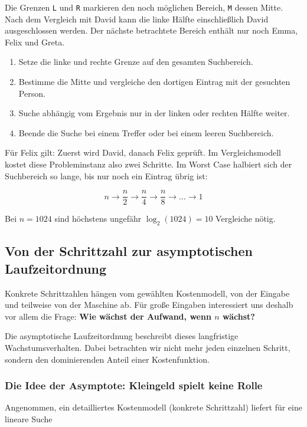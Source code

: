 \documentclass{article}
\begin{document}
Die Grenzen \texttt{L} und \texttt{R} markieren den noch möglichen Bereich, \texttt{M} dessen Mitte. Nach dem Vergleich mit David kann die linke Hälfte einschließlich David ausgeschlossen werden. Der nächste betrachtete Bereich enthält nur noch Emma, Felix und Greta.

\begin{enumerate}
  \item Setze die linke und rechte Grenze auf den gesamten Suchbereich.
  \item Bestimme die Mitte und vergleiche den dortigen Eintrag mit der gesuchten Person.
  \item Suche abhängig vom Ergebnis nur in der linken oder rechten Hälfte weiter.
  \item Beende die Suche bei einem Treffer oder bei einem leeren Suchbereich.
\end{enumerate}

Für Felix gilt: Zuerst wird David, danach Felix geprüft. Im Vergleichsmodell kostet diese Probleminstanz also zwei Schritte. Im Worst Case halbiert sich der Suchbereich so lange, bis nur noch ein Eintrag übrig ist:

\[
n \rightarrow \frac{n}{2} \rightarrow \frac{n}{4} \rightarrow \frac{n}{8} \rightarrow \dots \rightarrow 1
\]

Bei \(n=1024\) sind höchstens ungefähr \(\log_2(1024)=10\) Vergleiche nötig.

\subsection{Von der Schrittzahl zur asymptotischen Laufzeitordnung}

Konkrete Schrittzahlen hängen vom gewählten Kostenmodell, von der Eingabe und teilweise von der Maschine ab. Für große Eingaben interessiert uns deshalb vor allem die Frage: \textbf{Wie wächst der Aufwand, wenn \(n\) wächst?}

Die asymptotische Laufzeitordnung beschreibt dieses langfristige Wachstumsverhalten. Dabei betrachten wir nicht mehr jeden einzelnen Schritt, sondern den dominierenden Anteil einer Kostenfunktion.

\subsubsection{Die Idee der Asymptote: Kleingeld spielt keine Rolle}

Angenommen, ein detailliertes Kostenmodell (konkrete Schrittzahl) liefert für eine lineare Suche
\end{document}
